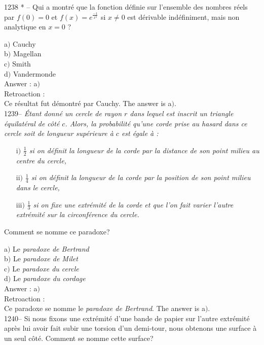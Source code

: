 ﻿\documentclass[letterpaper, 12pt]{article}
\begin{document}
1238 * -- Qui a montr\'e que la fonction d\'efinie sur l'ensemble
des nombres r\'eels par $f(0)=0$ et $f(x)=e^{\frac{-1}{x^2}}$ si
$x\not=0$ est d\'erivable ind\'efiniment, mais non analytique en
$x=0$ ?

a$)$ Cauchy \\
b$)$ Magellan \\
c$)$ Smith \\
d$)$ Vandermonde \\

Answer : a$)$\\

Retroaction : \\
Ce r\'esultat fut d\'emontr\'e par Cauchy.
The answer is a$)$.\\

1239-- {\sl \'Etant donn\'e un cercle de rayon $r$ dans lequel est
inscrit un triangle \'equilat\'eral de c\^ot\'e $c$. Alors, la
probabilit\'e qu'une corde prise au hasard dans ce cercle soit de
longueur sup\'erieure \`a $c$ est \'egale \`a :}
\begin{enumerate}
\item[i$)$]{\sl $\frac12$ si on d\'efinit la longueur de la corde par la
distance de son point milieu au centre du cercle,}
\item[ii$)$]{\sl $\frac14$ si on d\'efinit la longueur de la corde par la
position de son point milieu dans le cercle,}
\item[iii$)$]{\sl $\frac13$ si on fixe une extr\'emit\'e de la corde et que
l'on fait varier l'autre extr\'emit\'e sur la circonf\'erence du cercle.}
\end{enumerate}
Comment se nomme ce paradoxe?

a$)$ Le {\sl paradoxe de Bertrand} \\
b$)$ Le {\sl paradoxe de Milet} \\
c$)$ Le {\sl paradoxe du cercle}  \\
d$)$ Le {\sl paradoxe du cordage}\\

Answer : a$)$\\

Retroaction : \\
Ce paradoxe se nomme le {\sl paradoxe de Bertrand}.
The answer is a$)$.\\



1240-- Si nous fixons une extr\'emit\'e d'une bande de papier sur
l'autre extr\'emit\'e apr\`es lui avoir fait subir une torsion d'un
demi-tour, nous obtenons une surface \`a un seul c\^ot\'e. Comment
se nomme cette surface?
\end{document}

